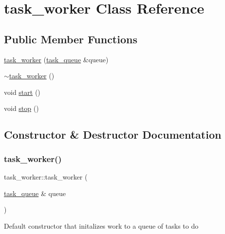 \hypertarget{classtask__worker}{}\section{task\+\_\+worker Class Reference}
\label{classtask__worker}
\subsection*{Public Member Functions}
\begin{DoxyCompactItemize}
\item 
\hyperlink{classtask__worker_add80ef340c383360fe6ac99f048a7212}{task\+\_\+worker} (\hyperlink{classtask__queue}{task\+\_\+queue} \&queue)
\item 
\hyperlink{classtask__worker_ade29daf48fef6c87172df511b73fb4ff}{$\sim$task\+\_\+worker} ()
\item 
void \hyperlink{classtask__worker_aa33aec83ef4e75f6a715176a31913d70}{start} ()
\item 
void \hyperlink{classtask__worker_aaa4b11b564b47d366e3acbe0e8205595}{stop} ()
\end{DoxyCompactItemize}


\subsection{Constructor \& Destructor Documentation}
\mbox{\label{classtask__worker_add80ef340c383360fe6ac99f048a7212}} 
\subsubsection{\texorpdfstring{task\+\_\+worker()}{task\_worker()}}
{\footnotesize\ttfamily task\+\_\+worker\+::task\+\_\+worker (\begin{DoxyParamCaption}\item[{\hyperlink{classtask__queue}{task\+\_\+queue} \&}]{queue }\end{DoxyParamCaption})\hspace{0.3cm}{\ttfamily [inline]}}

Default constructor that initalizes work to a queue of tasks to do \mbox{\label{classtask__worker_ade29daf48fef6c87172df511b73fb4ff}} 
